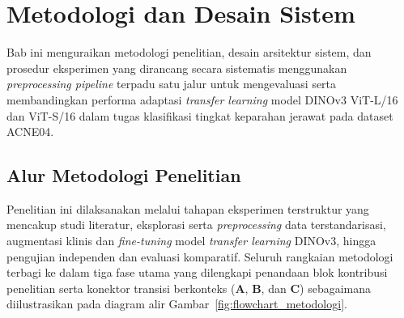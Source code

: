 \chapter{Metodologi dan Desain Sistem}

Bab ini menguraikan metodologi penelitian, desain arsitektur sistem, dan prosedur eksperimen yang dirancang secara sistematis menggunakan \textit{preprocessing pipeline} terpadu satu jalur untuk mengevaluasi serta membandingkan performa adaptasi \textit{transfer learning} model DINOv3 ViT-L/16 dan ViT-S/16 dalam tugas klasifikasi tingkat keparahan jerawat pada dataset ACNE04.

\section{Alur Metodologi Penelitian}

Penelitian ini dilaksanakan melalui tahapan eksperimen terstruktur yang mencakup studi literatur, eksplorasi serta \textit{preprocessing} data terstandarisasi, augmentasi klinis dan \textit{fine-tuning} model \textit{transfer learning} DINOv3, hingga pengujian independen dan evaluasi komparatif. Seluruh rangkaian metodologi terbagi ke dalam tiga fase utama yang dilengkapi penandaan blok kontribusi penelitian serta konektor transisi berkonteks (\textbf{A}, \textbf{B}, dan \textbf{C}) sebagaimana diilustrasikan pada diagram alir Gambar~\ref{fig:flowchart_metodologi}.

